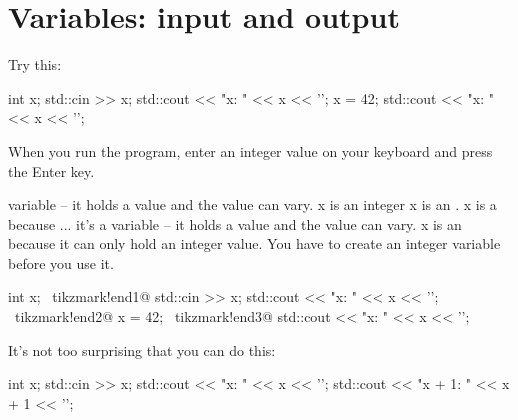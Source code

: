 %
%
%

\newpage\section{Variables: input and output}

Try this:
\begin{console}
int x;
std::cin >> x;
std::cout << "x: " << x << '\n';
x = 42;
std::cout << "x: " << x << '\n';
\end{console}

When you run the program, enter an integer value on your keyboard and
press the Enter key.

variable – it holds a value and the value can vary. x is an integer
x is an . x is a  because ... it's a
variable – it holds a value and the value can vary. x is an  because it can only hold an integer value. You have to create an
integer variable before you use it.


\begin{console}[commandchars=\~\!\@]
int x; ~tikzmark!end1@
std::cin >> x;
std::cout << "x: " << x << '\n'; ~tikzmark!end2@
x = 42; ~tikzmark!end3@
std::cout << "x: " << x << '\n';
\end{console}

%

It's not too surprising that you can do this:
\begin{console}
int x;
std::cin >> x;
std::cout << "x: " << x << '\n';
std::cout << "x + 1: " << x + 1 << '\n';
\end{console}


